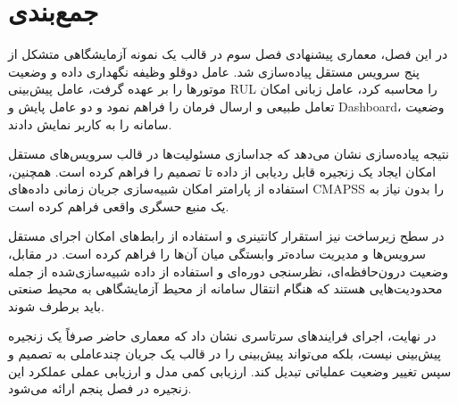 \section{جمع‌بندی}
\label{sec:impl-summary}

در این فصل، معماری پیشنهادی فصل سوم در قالب یک نمونه آزمایشگاهی متشکل از پنج سرویس مستقل پیاده‌سازی شد. عامل دوقلو وظیفه نگهداری داده و وضعیت موتور‌ها را بر عهده گرفت، عامل پیش‌بینی \gls{RUL} را محاسبه کرد، عامل زبانی امکان تعامل طبیعی و ارسال فرمان را فراهم نمود و دو عامل پایش و \gls{Dashboard}، وضعیت سامانه را به کاربر نمایش دادند.

نتیجه پیاده‌سازی نشان می‌دهد که جداسازی مسئولیت‌ها در قالب سرویس‌های مستقل امکان ایجاد یک زنجیره قابل ردیابی از داده تا تصمیم را فراهم کرده است. همچنین، استفاده از پارامتر  امکان شبیه‌سازی جریان زمانی داده‌های \gls{CMAPSS} را بدون نیاز به یک منبع حسگری واقعی فراهم کرده است.

در سطح زیرساخت نیز استقرار کانتینری و استفاده از رابط‌های  امکان اجرای مستقل سرویس‌ها و مدیریت ساده‌تر وابستگی میان آن‌ها را فراهم کرده است. در مقابل، وضعیت درون‌حافظه‌ای، نظرسنجی دوره‌ای و استفاده از داده شبیه‌سازی‌شده از جمله محدودیت‌هایی هستند که هنگام انتقال سامانه از محیط آزمایشگاهی به محیط صنعتی باید برطرف شوند.

در نهایت، اجرای فرایند‌های سرتاسری نشان داد که معماری حاضر صرفاً یک زنجیره پیش‌بینی نیست، بلکه می‌تواند پیش‌بینی را در قالب یک جریان چندعاملی به تصمیم و سپس تغییر وضعیت عملیاتی تبدیل کند. ارزیابی کمی مدل و ارزیابی عملی عملکرد این زنجیره در فصل پنجم ارائه می‌شود.
